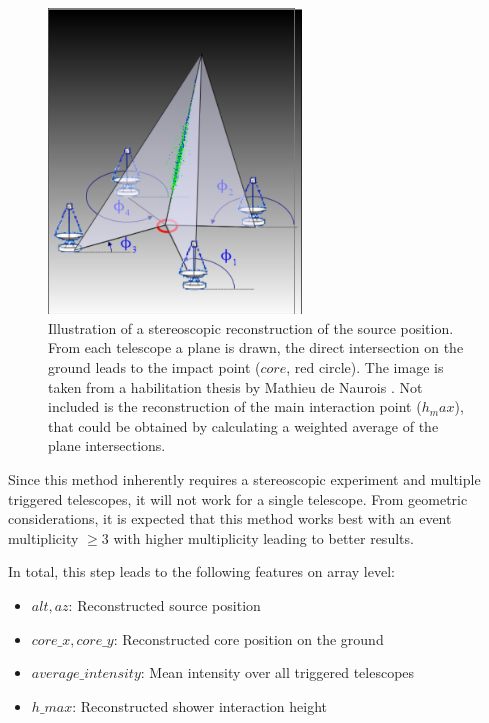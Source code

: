 \begin{figure}
	\centering
	\includegraphics[width=0.6\textwidth]{images/hillas_reco.png}
	\caption{Illustration of a stereoscopic reconstruction of the source position.
    From each telescope a plane is drawn, the direct intersection 
    on the ground leads to the impact point ($core$, red circle).
    The image is taken from a habilitation thesis by 
    Mathieu de Naurois \cite{hillas_reco}.
    Not included is the reconstruction of the main interaction point ($h_max$),
    that could be obtained by calculating a weighted average of the plane
    intersections.}
	\label{fig:hillas_reconstructor}
\end{figure}

Since this method inherently requires a stereoscopic experiment
and multiple triggered telescopes, it will not work for a single telescope.
From geometric considerations, it is expected
that this method works best with an event multiplicity 
$\geq 3$ with higher multiplicity leading to better results.

In total, this step leads to the following features on array level:
\begin{itemize}
    \item{$alt, az$: Reconstructed source position}
    \item{$core\_x, core\_y$: Reconstructed core position on the ground}
    \item{$average\_intensity$: Mean intensity over all triggered telescopes}
    \item{$h\_max$: Reconstructed shower interaction height}
\end{itemize}


